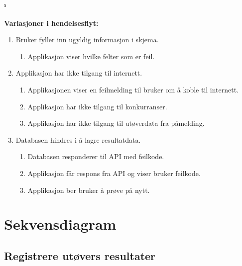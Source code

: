 ⁵\documentclass[norsk]{article}
\begin{document}
    \textbf{Variasjoner i hendelsesflyt:}
        \begin{enumerate}[start={\getrefnumber{itm:2A}}]
            \item Bruker fyller inn ugyldig informasjon i skjema.
                \begin{enumerate}
                    \item Applikasjon viser hvilke felter som er feil.
                \end{enumerate}
            \item Applikasjon har ikke tilgang til internett.
                \begin{enumerate}
                    \item Applikasjonen viser en feilmelding til bruker om å koble til internett.
                    \item Applikasjon har ikke tilgang til konkurranser. 
                    \item Applikasjon har ikke tilgang til utøverdata fra påmelding. 
                \end{enumerate}
            \item Databasen hindres i å lagre resultatdata.
                \begin{enumerate}
                    \item Databasen responderer til API med feilkode.
                    \item Applikasjon får respons fra API og viser bruker feilkode.
                    \item Applikasjon ber bruker å prøve på nytt.
                \end{enumerate}
        \end{enumerate}
        
\section{Sekvensdiagram}
\subsection{Registrere utøvers resultater}
\end{document}

